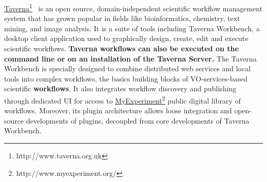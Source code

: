 \documentclass{aa}
\begin{document}
\href{http://www.taverna.org.uk}{Taverna}\footnote{http://www.taverna.org.uk}~\textbf{\citep{Wolstencroft01072013}} is an open source, domain-independent scientific workflow management system that has grown popular in fields like bioinformatics, chemistry, text mining, and image analysis. It is a suite of tools including Taverna Workbench, a desktop client application used to graphically design, create, edit and execute scientific workflows. \textbf{Taverna workflows can also be executed on the command line or on an installation of the Taverna Server.} The Taverna Workbench is specially designed to combine distributed web services and local tools into complex workflows, the basics building blocks of VO-services-based scientific \textbf{workflows}. It also integrates workflow discovery and publishing through dedicated UI for access to \href{http://www.myexperiment.org}{MyExperiment}\footnote{http://www.myexperiment.org/} \citep{Goble2010} public digital library of workflows. Moreover, its plugin architecture allows loose integration and open-source developments of plugins, decoupled from core developments of Taverna Workbench.
\end{document}

